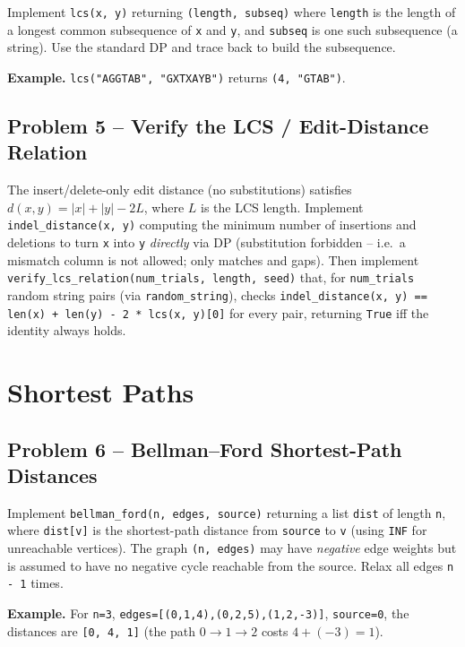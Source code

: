 \documentclass[11pt]{article}
\begin{document}
Implement \texttt{lcs(x, y)} returning \texttt{(length, subseq)} where \texttt{length} is
the length of a longest common subsequence of \texttt{x} and \texttt{y}, and \texttt{subseq}
is one such subsequence (a string). Use the standard DP and trace back to build the
subsequence.

\textbf{Example.} \texttt{lcs("AGGTAB", "GXTXAYB")} returns \texttt{(4, "GTAB")}.

\subsection*{Problem 5 -- Verify the LCS / Edit-Distance Relation}

The insert/delete-only edit distance (no substitutions) satisfies $d(x,y) = |x| + |y| - 2L$,
where $L$ is the LCS length. Implement \texttt{indel\_distance(x, y)} computing the minimum
number of insertions and deletions to turn \texttt{x} into \texttt{y} \emph{directly} via DP
(substitution forbidden -- i.e.\ a mismatch column is not allowed; only matches and gaps).
Then implement \texttt{verify\_lcs\_relation(num\_trials, length, seed)} that, for
\texttt{num\_trials} random string pairs (via \texttt{random\_string}), checks
\texttt{indel\_distance(x, y) == len(x) + len(y) - 2 * lcs(x, y)[0]} for every pair, returning
\texttt{True} iff the identity always holds.

\newpage
\section{Shortest Paths}

\subsection*{Problem 6 -- Bellman--Ford Shortest-Path Distances}

Implement \texttt{bellman\_ford(n, edges, source)} returning a list \texttt{dist} of length
\texttt{n}, where \texttt{dist[v]} is the shortest-path distance from \texttt{source} to
\texttt{v} (using \texttt{INF} for unreachable vertices). The graph
\texttt{(n, edges)} may have \emph{negative} edge weights but is assumed to have no negative
cycle reachable from the source. Relax all edges \texttt{n - 1} times.

\textbf{Example.} For \texttt{n=3}, \texttt{edges=[(0,1,4),(0,2,5),(1,2,-3)]},
\texttt{source=0}, the distances are \texttt{[0, 4, 1]} (the path $0\to1\to2$ costs
$4 + (-3) = 1$).
\end{document}
